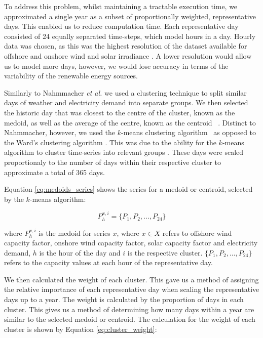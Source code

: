 To address this problem, whilst maintaining a tractable execution time, we approximated a single year as a subset of proportionally weighted, representative days. This enabled us to reduce computation time. Each representative day consisted of 24 equally separated time-steps, which model hours in a day. Hourly data was chosen, as this was the highest resolution of the dataset available for offshore and  onshore wind and solar irradiance \cite{Pfenninger2016}. A lower resolution would allow us to model more days, however, we would lose accuracy in terms of the variability of the renewable energy sources. 


Similarly to Nahmmacher \textit{et al.} we used a clustering technique to split similar days of weather and electricity demand into separate groups. We then selected the historic day that was closest to the centre of the cluster, known as the medoid, as well as the average of the centre, known as the centroid ~\cite{Nahmmacher2016}. Distinct to Nahmmacher, however, we used the $k$-means clustering algorithm~\cite{forgy65} as opposed to the Ward's clustering algorithm \cite{doi:10.1080/01621459.1963.10500845}. This was due to the ability for the $k$-means algorithm to cluster time-series into relevant groups \cite{Kell2018}. These days were scaled proportionaly to the number of days within their respective cluster to approximate a total of 365 days.

Equation \ref{eq:medoids_series} shows the series for a medoid or centroid, selected by the $k$-means algorithm:

\begin{equation}
\label{eq:medoids_series}
P^{x,i}_{h}=\{P_1, P_2, \ldots, P_{24}\}
\end{equation}

\noindent where $P^{x,i}_{h}$ is the medoid for series $x$, where $x\in X$ refers to offshore wind capacity factor, onshore wind capacity factor, solar capacity factor and electricity demand, $h$ is the hour of the day and $i$ is the respective cluster. $\{P_1, P_2, \ldots , P_{24}\}$ refers to the capacity values at each hour of the representative day.

We then calculated the weight of each cluster. This gave us a method of assigning the relative importance of each representative day when scaling the representative days up to a year. The weight is calculated by the proportion of days in each cluster. This gives us a method of determining how many days within a year are similar to the selected medoid or centroid. The calculation for the weight of each cluster is shown by Equation \ref{eq:cluster_weight}:

